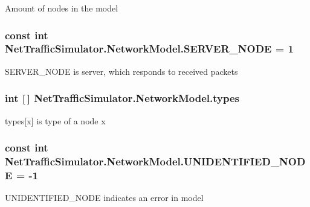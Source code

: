 Amount of nodes in the model \hypertarget{classNetTrafficSimulator_1_1NetworkModel_a9f536ecef65ce9ef55b52afa90ae8438}{
\subsubsection[{S\-E\-R\-V\-E\-R\-\_\-\-N\-O\-D\-E}]{\setlength{\rightskip}{0pt plus 5cm}const int Net\-Traffic\-Simulator.\-Network\-Model.\-S\-E\-R\-V\-E\-R\-\_\-\-N\-O\-D\-E = 1}}\label{classNetTrafficSimulator_1_1NetworkModel_a9f536ecef65ce9ef55b52afa90ae8438}
S\-E\-R\-V\-E\-R\-\_\-\-N\-O\-D\-E is server, which responds to received packets \hypertarget{classNetTrafficSimulator_1_1NetworkModel_aa8f0b62fb9e9029f0068135b56a46a9c}{
\subsubsection[{types}]{\setlength{\rightskip}{0pt plus 5cm}int \mbox{[}$\,$\mbox{]} Net\-Traffic\-Simulator.\-Network\-Model.\-types\hspace{0.3cm}{\ttfamily [private]}}}\label{classNetTrafficSimulator_1_1NetworkModel_aa8f0b62fb9e9029f0068135b56a46a9c}
types\mbox{[}x\mbox{]} is type of a node x \hypertarget{classNetTrafficSimulator_1_1NetworkModel_a6736303b5919398aef63238c6436fe9c}{
\subsubsection[{U\-N\-I\-D\-E\-N\-T\-I\-F\-I\-E\-D\-\_\-\-N\-O\-D\-E}]{\setlength{\rightskip}{0pt plus 5cm}const int Net\-Traffic\-Simulator.\-Network\-Model.\-U\-N\-I\-D\-E\-N\-T\-I\-F\-I\-E\-D\-\_\-\-N\-O\-D\-E = -\/1}}\label{classNetTrafficSimulator_1_1NetworkModel_a6736303b5919398aef63238c6436fe9c}
U\-N\-I\-D\-E\-N\-T\-I\-F\-I\-E\-D\-\_\-\-N\-O\-D\-E indicates an error in model 

